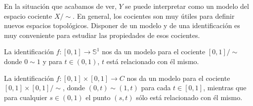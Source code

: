 \begin{observation}
En la situación que acabamos de ver, $\displaystyle Y $ se puede interpretar como un modelo del espacio cociente $\displaystyle X/\sim  $. En general, los cocientes son muy útiles para definir nuevos espacios topológicos. Disponer de un modelo y de una identificación es muy conveniente para estudiar las propiedades de esos cocientes.
\end{observation}
\begin{eg}
	La identificación $\displaystyle f : \left[0,1\right] \to \mathbb{S}^{1} $ nos da un modelo para el cociente $\displaystyle \left[0,1\right] / \sim  $ donde $\displaystyle 0 \sim 1 $ y para $\displaystyle t \in \left(0,1\right) $, $\displaystyle t $ está relacionado con él mismo.
\end{eg}
\begin{eg}
	La identificación $\displaystyle f : \left[0,1\right] \times \left[0,1\right] \to C $ nos da un modelo para el cociente $\displaystyle \left[0,1\right] \times\left[0,1\right] /\sim $, donde $\displaystyle \left(0,t\right)\sim\left(1,t\right) $ para cada $\displaystyle t \in \left[0,1\right]  $, mientras que para cualquier $\displaystyle s \in \left(0,1\right) $ el punto $\displaystyle \left(s,t\right) $ sólo está relacionado con él mismo.
\end{eg}

